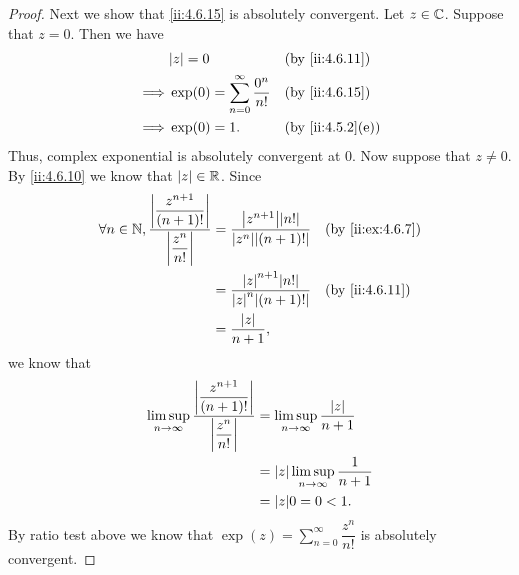 \begin{proof}
  Next we show that \cref{ii:4.6.15} is absolutely convergent.
  Let \(z \in \mathbb{C}\).
  Suppose that \(z = 0\).
  Then we have
  \begin{align*}
             & \abs{z} = 0                                   &  & \by{ii:4.6.11}   \\
    \implies & \exp(0) = \sum_{n = 0}^\infty \dfrac{0^n}{n!} &  & \by{ii:4.6.15}   \\
    \implies & \exp(0) = 1.                                  &  & \by{ii:4.5.2}[e]
  \end{align*}
  Thus, complex exponential is absolutely convergent at \(0\).
  Now suppose that \(z \neq 0\).
  By \cref{ii:4.6.10} we know that \(\left\lvert z\right\rvert \in \mathbb{R}\).
  Since
  \begin{align*}
    \forall n \in \N, \dfrac{\abs{\dfrac{z^{n + 1}}{(n + 1)!}}}{\abs{\dfrac{z^n}{n!}}} & = \dfrac{\abs{z^{n + 1}} \abs{n!}}{\abs{z^n} \abs{(n + 1)!}} &  & \by{ii:ex:4.6.7} \\
                                                                                       & = \dfrac{\abs{z}^{n + 1} \abs{n!}}{\abs{z}^n \abs{(n + 1)!}} &  & \by{ii:4.6.11}   \\
                                                                                       & = \dfrac{\abs{z}}{n + 1},
  \end{align*}
  we know that
  \begin{align*}
    \limsup_{n \to \infty} \dfrac{\abs{\dfrac{z^{n + 1}}{(n + 1)!}}}{\abs{\dfrac{z^n}{n!}}} & = \limsup_{n \to \infty} \dfrac{\abs{z}}{n + 1}   \\
                                                                                            & = \abs{z} \limsup_{n \to \infty} \dfrac{1}{n + 1} \\
                                                                                            & = \abs{z} 0 = 0 < 1.
  \end{align*}
  By ratio test above we know that \(\exp(z) = \sum_{n = 0}^\infty \dfrac{z^n}{n!}\) is absolutely convergent.


\end{proof}
